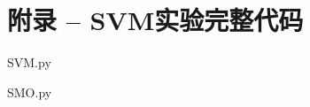 \documentclass{progartcn}
\begin{document}

%

\section{附录 -- SVM实验完整代码 }
SVM.py

\newpage
SMO.py

\end{document}
